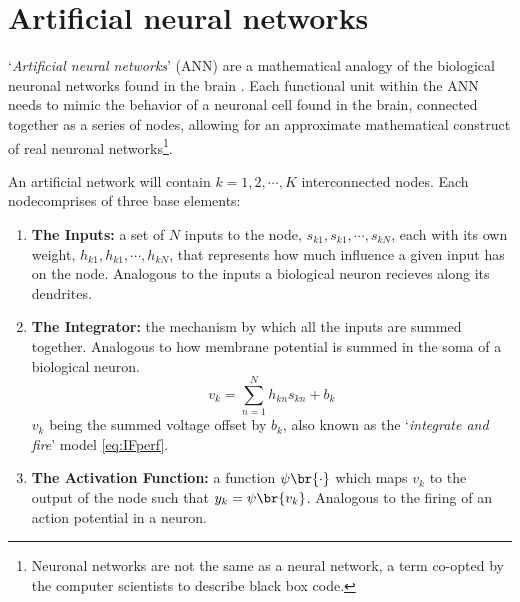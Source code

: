 \documentclass[../../Orator.tex]{subfiles}
\begin{document}
\chapter{Artificial neural networks}

`\textit{Artificial neural networks}' (ANN) are a mathematical analogy of the biological neuronal networks found in the brain \cite{EEGbook}. Each functional unit within the ANN needs to mimic the behavior of a neuronal cell found in the brain, connected together as a series of nodes, allowing for an approximate mathematical construct of real neuronal networks\footnote{Neuronal networks are not the same as a neural network, a term co-opted by the computer scientists to describe black box code.}.

An artificial network will contain \(k = 1, 2, \cdots , K\) interconnected nodes. Each node\footnotemark comprises of three base elements:
\begin{enumerate}
    \item \textbf{The Inputs:} a set of \(N\) inputs to the node, \(s_{k1}, s_{k1}, \cdots, s_{kN}\), each with its own weight, \(h_{k1}, h_{k1}, \cdots, h_{kN}\), that represents how much influence a given input has on the node. Analogous to the inputs a biological neuron recieves along its dendrites.
    \item \textbf{The Integrator:} the mechanism by which all the inputs are summed together. Analogous to how membrane potential is summed in the soma of a biological neuron. 
    \begin{equation}
        v_k = \sum_{n=1}^N h_{kn}s_{kn} + b_k
    \end{equation}
    \(v_k\) being the summed voltage offset by \(b_k\), also known as the `\textit{integrate and fire}' model \cref{eq:IFperf}. 
    \item \textbf{The Activation Function:} a function \(\psi\br{ \cdot }\) which maps \(v_k\) to the output of the node such that \(y_k = \psi\br{v_k}\). Analogous to the firing of an action potential in a neuron.
\end{enumerate}
\end{document}
